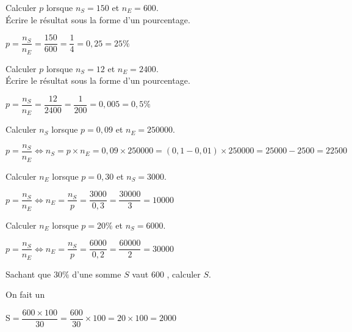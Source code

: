 \documentclass[a4paper,10pt]{book}        %
\begin{document}
	\begin{enumMet}
		\item Calculer $p$ lorsque $n_S = 150$ et $n_E = 600$.\\
		Écrire le résultat sous la forme d'un pourcentage.
		\begin{corrBox}
			$p=\dfrac{n_S}{n_E}=\dfrac{150}{600}=\dfrac{1}{4}=0,25=25\%$		
		\end{corrBox}
		\item Calculer $p$ lorsque $n_S = 12$ et $n_E= 2 400$.\\
		Écrire le résultat sous la forme d'un pourcentage.
		\begin{corrBox}
			$p=\dfrac{n_S}{n_E}=\dfrac{12}{2400}=\dfrac{1}{200}=0,005=0,5\%$		
		\end{corrBox}
		\item Calculer $n_S$ lorsque $p = 0,09$ et $n_E= 250 000$.
		\begin{corrBox}
			$p=\dfrac{n_S}{n_E}\iff n_S=p\times n_E=0,09\times 250000=(0,1-0,01)\times 250000=25000-2500=22500$		
		\end{corrBox}
		\item Calculer $n_E$ lorsque $p = 0,30$ et $n_S = 3 000$.
		\begin{corrBox}
			$p=\dfrac{n_S}{n_E}\iff n_E=\dfrac{n_S}{p}=\dfrac{3000}{0,3}=\dfrac{30000}{3}=10000$		
		\end{corrBox}
		\item Calculer $n_E$ lorsque $p = 20 \%$ et $n_S = 6 000$.
		\begin{corrBox}
			$p=\dfrac{n_S}{n_E}\iff n_E=\dfrac{n_S}{p}=\dfrac{6000}{0,2}=\dfrac{60000}{2}=30000$		
		\end{corrBox}
		\item Sachant que $30 \%$ d'une somme $S$ vaut $600$ \EUR{}, calculer $S$.
		\begin{corrBox}
			On fait un 	
			
			S$=\dfrac{600\times 100}{30}=\dfrac{600}{30}\times 100=20\times 100=2000$
		\end{corrBox}
	\end{enumMet}
	
\end{document}
